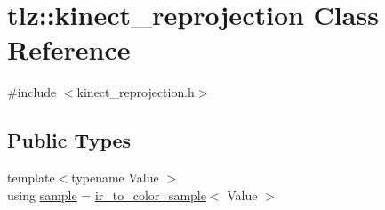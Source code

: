 \hypertarget{classtlz_1_1kinect__reprojection}{}\section{tlz\+:\+:kinect\+\_\+reprojection Class Reference}
\label{classtlz_1_1kinect__reprojection}


{\ttfamily \#include $<$kinect\+\_\+reprojection.\+h$>$}

\subsection*{Public Types}
\begin{DoxyCompactItemize}
\item 
{\footnotesize template$<$typename Value $>$ }\\using \hyperlink{classtlz_1_1kinect__reprojection_afe84b47774e13076ec08d9d5376262d7}{sample} = \hyperlink{structtlz_1_1ir__to__color__sample}{ir\+\_\+to\+\_\+color\+\_\+sample}$<$ Value $>$
\end{DoxyCompactItemize}

